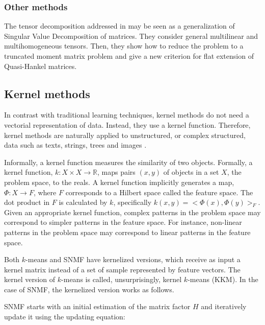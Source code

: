 \documentclass[letterpaper,12pt]{article}
\begin{document}



\subsubsection{Other methods}

 The tensor decomposition addressed in \cite{Bernardi2013} may be seen as a generalization of Singular Value Decomposition of matrices. They consider general multilinear and multihomogeneous tensors. Then, they show how to reduce the problem to a truncated moment matrix problem and give a new criterion for flat extension of Quasi-Hankel matrices. 

 
\subsection{Kernel methods}

In contrast with traditional learning techniques, kernel methods do not need a vectorial representation of data. Instead, they use a kernel function. Therefore, kernel methods are naturally applied to unstructured, or complex structured, data such as texts, strings, trees and images \cite{Shawe-Taylor2004}. 

Informally, a kernel function measures the similarity of two objects. Formally, a kernel function, $k:X\times X\rightarrow\mathbb{R}$,
maps pairs $(x,y)$ of objects in a set $X$, the problem space, to the reals. A kernel function implicitly generates a map, $\Phi:X\rightarrow F$, where $F$ corresponds to a Hilbert space called the feature space. The dot product in $F$ is calculated by $k$, specifically $k(x,y)=<\Phi(x),\Phi(y)>_{F}$. Given an appropriate kernel function, complex patterns in the problem space may correspond to simpler patterns in the feature space. For instance, non-linear patterns in the problem space may correspond to linear patterns in the feature space. 


Both $k$-means and SNMF have kernelized versions, which receive as input a kernel matrix instead of a set of sample represented by feature vectors. The kernel version of $k$-means is called, unsurprisingly, kernel $k$-means (KKM). In the case of SNMF, the kernelized version works as follows.

SNMF starts with an initial estimation of the matrix factor $H$ and iteratively update it using the updating equation:
\end{document}
